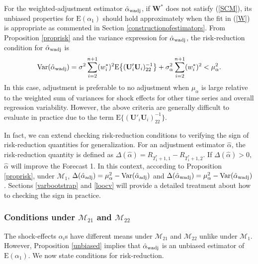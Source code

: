 \documentclass[11pt]{article}
\def\mbf#1{\mathbf{#1}} %
\def\mrm#1{\mathrm{#1}} %
\def\mc#1{\mathcal{#1}} %
\def\E#1{\mathrm{E}(#1)} %
\def\var#1{\mathrm{Var}(#1)} %
\theoremstyle{definition}
\begin{document}
For the weighted-adjustment estimator $\hat{\alpha}_{\rm wadj}$, if  $\mathbf{W}^*$ does not satisfy (\ref{SCM}), its unbiased properties for $\E{\alpha_1}$ should hold approximately when the fit in (\ref{W}) is appropriate as commented in Section \ref{constructionofestimators}. From Proposition \ref{proprisk} and the variance expression for $\hat{\alpha}_{\rm wadj}$, the risk-reduction condition for $\hat{\alpha}_{\rm wadj}$ is
\begin{equation} \label{varwadj}
\var{\hat{\alpha}_{\rm wadj}}
 = \sigma^2\sum_{i=2}^{n+1}(w_i^*)^2\mrm{E}\big\{(\mbf{U}'_i\mbf{U}_i)^{-1}_{22}\big\}+\sigma^2_{\alpha}\sum_{i=2}^{n+1}(w_i^*)^2 < \mu_{\alpha}^2.
\end{equation}
In this case, adjustment is preferable to no adjustment when $\mu_{\alpha}$ is large relative to the weighted sum of variances for shock effects for other time series and overall regression variability.  However, the above criteria are generally difficult to evaluate in practice due to the term $\mrm{E}\big\{(\mbf{U}'_i\mbf{U}_i)^{-1}_{22}\big\}$. 


In fact, we can extend checking risk-reduction conditions to verifying the sign of risk-reduction quantities for generalization. For an adjustment estimator $\hat{\alpha}$, the risk-reduction quantity is defined as  $\Delta(\hat{\alpha})=R_{T_1^*+1,1}-R_{T_1^*+1,2}$. If $\Delta(\hat{\alpha})>0$, $\hat{\alpha}$ will improve the Forecast 1. In this context, according to Proposition \ref{proprisk}, under $\mc{M}_1$, $\Delta(\hat{\alpha}_{\rm adj})= \mu_{\alpha}^2-\var{\hat{\alpha}_{\rm adj}}$ and $\Delta(\hat{\alpha}_{\rm wadj})= \mu_{\alpha}^2-\var{\hat{\alpha}_{\rm wadj}}$. Sections \ref{varbootstrap} and \ref{loocv} will provide a detailed treatment about how to checking the sign  in practice.



\subsubsection{Conditions under $\mc{M}_{21}$ and $\mc{M}_{22}$}
\label{conditionsm2122}

The shock-effects $\alpha_i$s have different means under $\mc{M}_{21}$ and $\mc{M}_{22}$ unlike under $\mc{M}_1$. %
However, Proposition \ref{unbiased} implies that $\hat{\alpha}_{\rm wadj}$ is an unbiased estimator of $\E{\alpha_1}$. %
We now state conditions for risk-reduction.
\end{document}
